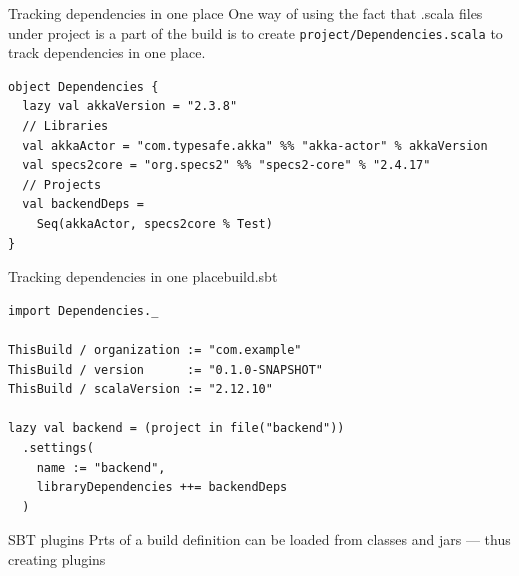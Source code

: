 \documentclass[aspectratio=169]{beamer}
\begin{document}
\begin{frame}[fragile]{Tracking dependencies in one place}
  One way of using the fact that .scala files under project is a part of the build is
  to create \texttt{project/Dependencies.scala} to track dependencies in one place.
  \begin{verbatim}
object Dependencies {
  lazy val akkaVersion = "2.3.8"
  // Libraries
  val akkaActor = "com.typesafe.akka" %% "akka-actor" % akkaVersion
  val specs2core = "org.specs2" %% "specs2-core" % "2.4.17"
  // Projects
  val backendDeps =
    Seq(akkaActor, specs2core % Test)
} 
  \end{verbatim}
\end{frame}

\begin{frame}[fragile]{Tracking dependencies in one place}{build.sbt}
\begin{verbatim}
import Dependencies._

ThisBuild / organization := "com.example"
ThisBuild / version      := "0.1.0-SNAPSHOT"
ThisBuild / scalaVersion := "2.12.10"

lazy val backend = (project in file("backend"))
  .settings(
    name := "backend",
    libraryDependencies ++= backendDeps
  )
\end{verbatim}
\end{frame}

\begin{frame}[fragile]{SBT plugins}
  Prts of a build definition can be loaded from classes and jars --- thus creating plugins
\end{frame}
\end{document}
